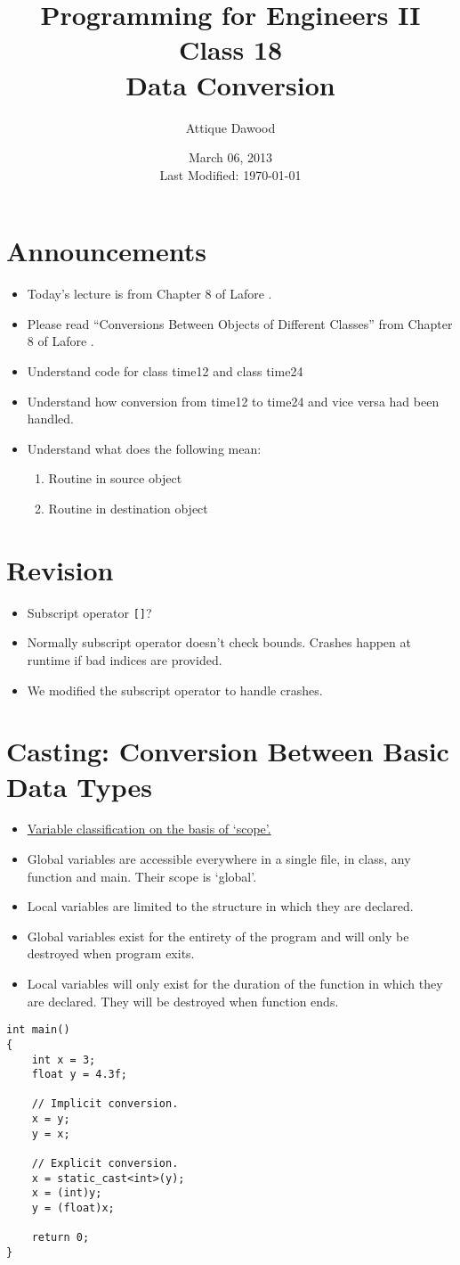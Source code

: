 \documentclass[12pt,a4paper]{article}
\title{\vspace{-2cm}Programming for Engineers II\\Class 18\\Data Conversion}
\author{Attique Dawood}
\date{March 06, 2013\\[0.2cm] Last Modified: \today}
\begin{document}
\maketitle
\section{Announcements}
\begin{itemize}
\item Today's lecture is from Chapter 8 of Lafore \cite{Lafore}.
\item Please read ``Conversions Between Objects of Different Classes'' from Chapter 8 of Lafore \cite{Lafore}.
\item Understand code for class time12 and class time24
\item Understand how conversion from time12 to time24 and vice versa had been handled.
\item Understand what does the following mean:
\begin{enumerate}
\item Routine in source object
\item Routine in destination object
\end{enumerate}
\end{itemize}
\section{Revision}
\begin{itemize}
\item Subscript operator \verb|[]|?
\item Normally subscript operator doesn't check bounds. Crashes happen at runtime if bad indices are provided.
\item We modified the subscript operator to handle crashes.
\end{itemize}
\section{Casting: Conversion Between Basic Data Types}
\begin{itemize}
\item \underline{Variable classification on the basis of `scope'.}
\item Global variables are accessible everywhere in a single file, in class, any function and main. Their scope is `global'.
\item Local variables are limited to the structure in which they are declared.
\item Global variables exist for the entirety of the program and will only be destroyed when program exits.
\item Local variables will only exist for the duration of the function in which they are declared. They will be destroyed when function ends.
\end{itemize}
\begin{lstlisting}[caption={Variable Casting}]
int main()
{
	int x = 3;
	float y = 4.3f;

	// Implicit conversion.
	x = y;
	y = x;

	// Explicit conversion.
	x = static_cast<int>(y);
	x = (int)y;
	y = (float)x;
	
	return 0;
}
\end{lstlisting}
\end{document}
